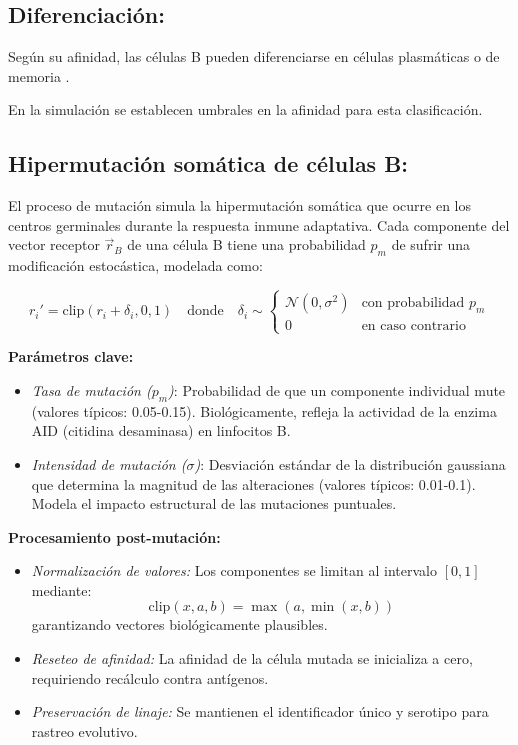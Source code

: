     \subsection*{Diferenciación:}
    
    Según su afinidad, las células B pueden diferenciarse en células plasmáticas o de memoria \cite{murphy2017janeway}.

    En la simulación se establecen umbrales en la afinidad para esta clasificación.
    \subsection*{Hipermutación somática de células B:}

El proceso de mutación simula la hipermutación somática que ocurre en los centros germinales durante la respuesta inmune adaptativa. Cada componente del vector receptor $\vec{r}_B$ de una célula B tiene una probabilidad $p_m$ de sufrir una modificación estocástica, modelada como:

\begin{equation}
r_i' = \text{clip}\left(r_i + \delta_i, 0, 1\right) \quad \text{donde} \quad \delta_i \sim 
\begin{cases} 
\mathcal{N}(0, \sigma^2) & \text{con probabilidad } p_m \\
0 & \text{en caso contrario}
\end{cases}
\end{equation}

\noindent \textbf{Parámetros clave:}
\begin{itemize}
    \item \textit{Tasa de mutación ($p_m$)}: Probabilidad de que un componente individual mute (valores típicos: 0.05-0.15). Biológicamente, refleja la actividad de la enzima AID (citidina desaminasa) en linfocitos B.
    
    \item \textit{Intensidad de mutación ($\sigma$)}: Desviación estándar de la distribución gaussiana que determina la magnitud de las alteraciones (valores típicos: 0.01-0.1). Modela el impacto estructural de las mutaciones puntuales.
\end{itemize}

\noindent \textbf{Procesamiento post-mutación:}
\begin{itemize}
    \item \textit{Normalización de valores:} Los componentes se limitan al intervalo $[0,1]$ mediante:
    \[
    \text{clip}(x, a, b) = \max(a, \min(x, b))
    \]
    garantizando vectores biológicamente plausibles.
    
    \item \textit{Reseteo de afinidad:} La afinidad de la célula mutada se inicializa a cero, requiriendo recálculo contra antígenos.
    
    \item \textit{Preservación de linaje:} Se mantienen el identificador único y serotipo para rastreo evolutivo.
\end{itemize}

